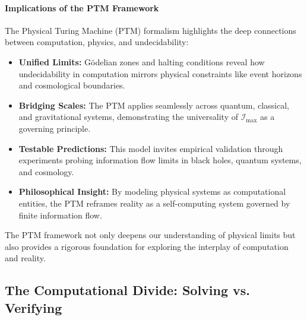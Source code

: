 \documentclass[12pt]{article}
\begin{document}
\paragraph{Implications of the PTM Framework}
The Physical Turing Machine (PTM) formalism highlights the deep connections between computation, physics, and undecidability:
\begin{itemize}
    \item \textbf{Unified Limits:} Gödelian zones and halting conditions reveal how undecidability in computation mirrors physical constraints like event horizons and cosmological boundaries.
    \item \textbf{Bridging Scales:} The PTM applies seamlessly across quantum, classical, and gravitational systems, demonstrating the universality of \(\mathcal{I}_{\text{max}}\) as a governing principle.
    \item \textbf{Testable Predictions:} This model invites empirical validation through experiments probing information flow limits in black holes, quantum systems, and cosmology.
    \item \textbf{Philosophical Insight:} By modeling physical systems as computational entities, the PTM reframes reality as a self-computing system governed by finite information flow.
\end{itemize}
The PTM framework not only deepens our understanding of physical limits but also provides a rigorous foundation for exploring the interplay of computation and reality.


\subsection{The Computational Divide: Solving vs. Verifying}
\end{document}
